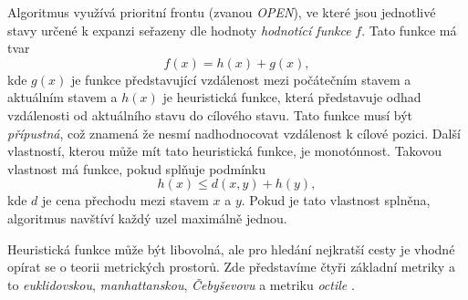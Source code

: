 Algoritmus využívá prioritní frontu (zvanou \emph{OPEN}), ve které jsou jednotlivé stavy určené k expanzi seřazeny dle hodnoty \emph{hodnotící funkce} $f$. Tato funkce má tvar
\begin{equation}
	f\left(x\right) = h\left(x\right) + g\left(x\right),
\end{equation}
kde $ g\left(x\right)$ je funkce představující vzdálenost mezi počátečním stavem a aktuálním stavem a $h\left(x\right)$ je heuristická funkce, která představuje odhad vzdálenosti od aktuálního stavu do cílového stavu. Tato funkce musí být \emph{přípustná}, což znamená že nesmí nadhodnocovat vzdálenost k cílové pozici. Další vlastností, kterou může mít tato heuristická funkce, je monotónnost. Takovou vlastnost má funkce, pokud splňuje podmínku
\begin{equation}
	h\left(x\right)\leq d\left(x,y\right) + h\left(y\right),
\end{equation}
kde $d$ je cena přechodu mezi stavem $x$ a $y$. Pokud je tato vlastnost splněna, algoritmus navštíví každý uzel maximálně jednou.

Heuristická funkce může být libovolná, ale pro hledání nejkratší cesty je vhodné opírat se o teorii metrických prostorů. Zde představíme čtyři základní metriky a to \emph{euklidovskou}, \emph{manhattanskou}, \emph{Čebyševovu} a metriku \emph{octile} \cite{Patel19972020}.

